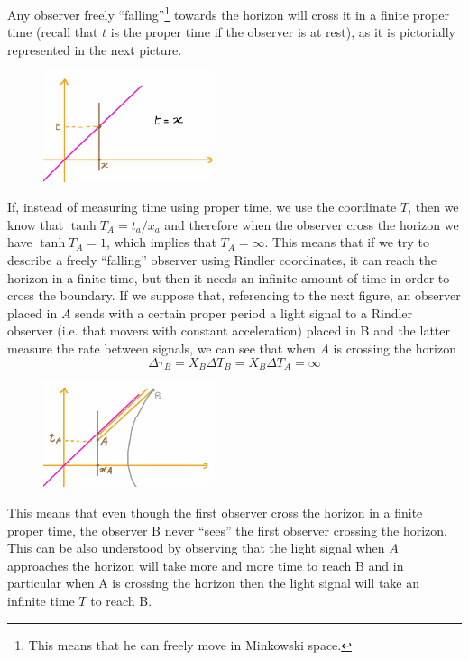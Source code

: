 \documentclass[../main/main.tex]{subfiles}
\begin{document}
Any observer freely ``falling''\footnote{This means that he can freely move in Minkowski space.} towards the horizon will cross it in a finite proper time (recall that $t$ is the proper time if the observer is at rest), as it is pictorially represented in the next picture.
\begin{figure}[H]
\centering
\includegraphics[width=5cm]{../img/observer-crossing-horizon-prop-time.jpg}
\end{figure}
\noindent If, instead of measuring time using proper time, we use the coordinate $T$, then we know that $\tanh T_A=t_a/x_a$ and therefore when the observer cross the horizon we have $\tanh T_A=1$, which implies that $T_A=\infty$. This means that if we try to describe a freely ``falling'' observer using Rindler coordinates, it can reach the horizon in a finite time, but then it needs an infinite amount of time in order to cross the boundary.
If we suppose that, referencing to the next figure, an observer placed in $A$ sends with a certain proper period a light signal to a Rindler observer (i.e. that movers with constant acceleration) placed in B and the latter measure the rate between signals, we can see that when $A$ is crossing the horizon
\[\Delta \tau_B=X_B\Delta T_B=X_B\Delta T_A=\infty\]
\begin{figure}[H]
\centering
\includegraphics[width=5cm]{../img/observer-crossing-horizon-T-time.jpg}
\end{figure}
\noindent This means that even though the first observer cross the horizon in a finite proper time, the observer B never ``sees'' the first observer crossing the horizon. This can be also understood by observing that the light signal when $A$ approaches the horizon will take more and more time to reach B and in particular when A is crossing the horizon then the light signal will take an infinite time $T$ to reach B.
\end{document}
